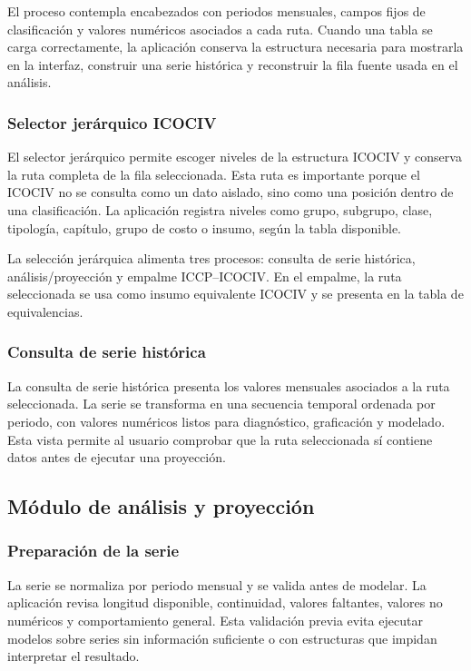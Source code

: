 \documentclass[12pt,letterpaper]{article}
\newcommand{\ICOCIV}{ICOCIV}
\newcommand{\ICCP}{ICCP}
\begin{document}
El proceso contempla encabezados con periodos mensuales, campos fijos de clasificación y valores numéricos asociados a cada ruta. Cuando una tabla se carga correctamente, la aplicación conserva la estructura necesaria para mostrarla en la interfaz, construir una serie histórica y reconstruir la fila fuente usada en el análisis.

\subsubsection{Selector jerárquico ICOCIV}

El selector jerárquico permite escoger niveles de la estructura \ICOCIV{} y conserva la ruta completa de la fila seleccionada. Esta ruta es importante porque el \ICOCIV{} no se consulta como un dato aislado, sino como una posición dentro de una clasificación. La aplicación registra niveles como grupo, subgrupo, clase, tipología, capítulo, grupo de costo o insumo, según la tabla disponible.

La selección jerárquica alimenta tres procesos: consulta de serie histórica, análisis/proyección y empalme \ICCP--\ICOCIV. En el empalme, la ruta seleccionada se usa como insumo equivalente \ICOCIV{} y se presenta en la tabla de equivalencias.

\subsubsection{Consulta de serie histórica}

La consulta de serie histórica presenta los valores mensuales asociados a la ruta seleccionada. La serie se transforma en una secuencia temporal ordenada por periodo, con valores numéricos listos para diagnóstico, graficación y modelado. Esta vista permite al usuario comprobar que la ruta seleccionada sí contiene datos antes de ejecutar una proyección.

\subsection{Módulo de análisis y proyección}

\subsubsection{Preparación de la serie}

La serie se normaliza por periodo mensual y se valida antes de modelar. La aplicación revisa longitud disponible, continuidad, valores faltantes, valores no numéricos y comportamiento general. Esta validación previa evita ejecutar modelos sobre series sin información suficiente o con estructuras que impidan interpretar el resultado.
\end{document}
